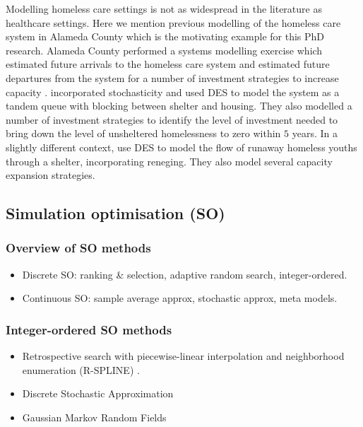 \documentclass[12pt,a4paper]{article}
\begin{document}
Modelling homeless care settings is not as widespread in the literature as healthcare settings. Here we mention previous modelling of the homeless care system in Alameda County which is the motivating example for this PhD research. Alameda County performed a systems modelling exercise which estimated future arrivals to the homeless care system and estimated future departures from the system for a number of investment strategies to increase capacity \citep{hometogether2022}. \cite{singham2023discrete} incorporated stochasticity and used DES to model the system as a tandem queue with blocking between shelter and housing. They also modelled a number of investment strategies to identify the level of investment needed to bring down the level of unsheltered homelessness to zero within $5$ years. In a slightly different context, \cite{kaya2022discrete} use DES to model the flow of runaway homeless youths through a shelter, incorporating reneging. They also model several capacity expansion strategies. 

\subsection{Simulation optimisation (SO)}

\subsubsection{Overview of SO methods}

\begin{itemize}[noitemsep]
\item Discrete SO: ranking \& selection, adaptive random search, integer-ordered.
\item Continuous SO: sample average approx, stochastic approx, meta models.
\end{itemize}

\subsubsection{Integer-ordered SO methods}
\begin{itemize} [noitemsep]
    \item Retrospective search with piecewise-linear interpolation and neighborhood enumeration (R-SPLINE) \citep{wang2013integer}.
    \item Discrete Stochastic Approximation \citep{lim2012stochastic}
    \item Gaussian Markov Random Fields \citep{l2019gaussian}
\end{itemize}
\end{document}
